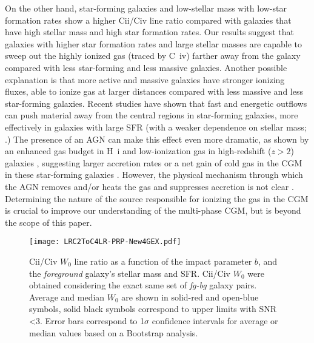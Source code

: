 \documentclass[longauth]{aa}
\begin{document}
On the other hand, star-forming galaxies and low-stellar mass with low-star
formation rates show a higher C{\sc ii}/C{\sc iv} line ratio compared with
galaxies that have high stellar mass and high star formation rates. Our
results suggest that galaxies with higher star formation rates and large
stellar masses are capable to sweep out the highly ionized gas (traced by C\,
{\sc iv}) farther away from the galaxy compared with less star-forming and
less massive galaxies. Another possible explanation is that more active and
massive galaxies have stronger ionizing fluxes, able to ionize gas at larger
distances compared with less massive and less star-forming galaxies. Recent
studies have shown that fast and energetic outflows can push material away
from the central regions in star-forming galaxies, more effectively in
galaxies with large SFR (with a weaker dependence on stellar mass; 
\citealt{Heckman15,Cicone16,Trainor15,Feltre20}.) The presence of an AGN can
make this effect even more dramatic, as shown by an enhanced gas budget in
{\sc H\, i} and low-ionization gas in high-redshift ($z>2$) galaxies \citep
{Prochaska14}, suggesting larger accretion rates or a net gain of cold gas
in the CGM in these star-forming galaxies \citep{Faucher16}. However, the
physical mechanism through which the AGN removes and/or heats the gas and
suppresses accretion is not clear \citep{Tumlinson17}. Determining the
nature of the source responsible for ionizing the gas in the CGM is crucial
to improve our understanding of the multi-phase CGM, but is beyond the scope
of this paper. 

   \begin{figure*}
   \centering
   \texttt{[image: LRC2ToC4LR-PRP-New4GEX.pdf]}
   \caption{C{\sc ii}/C{\sc iv} $W_{0}$ line ratio as a function of the impact
    parameter $b$, and the \textit{foreground} galaxy's stellar mass and SFR.
    C{\sc ii}/C{\sc iv} $W_{0}$ were obtained considering the exact same set
    of \textit{fg-bg} galaxy pairs. Average and median $W_{0}$ are shown in
    solid-red and open-blue symbols, solid black symbols
    correspond to upper limits with SNR <3. Error bars correspond to
    1$\sigma$ confidence intervals for average or median values based on a
    Bootstrap analysis.}
    \label{Fig:EW-C2C4LR}%
    \end{figure*}
\end{document}
